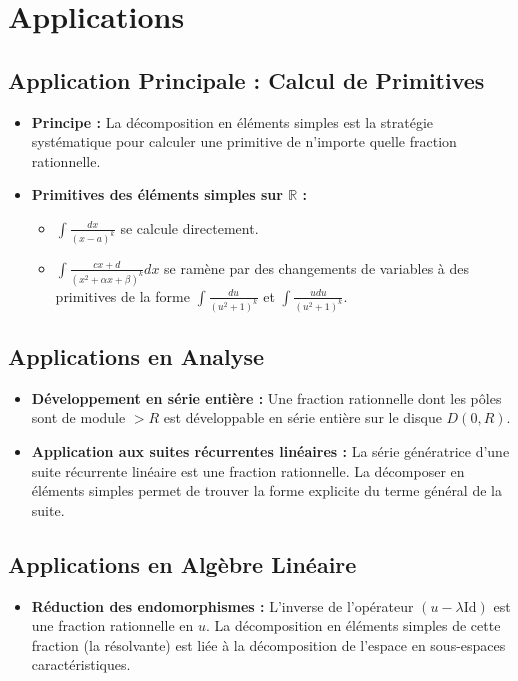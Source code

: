 \documentclass[12pt, a4paper, parskip=full]{report}
\theoremstyle{agregstyle}
\begin{document}
\section{Applications}

\subsection{Application Principale : Calcul de Primitives}
\begin{itemize}
    \item \textbf{Principe :} La décomposition en éléments simples est la stratégie systématique pour calculer une primitive de n'importe quelle fraction rationnelle.
    \item \textbf{Primitives des éléments simples sur $\mathbb{R}$ :}
        \begin{itemize}
            \item $\int \frac{dx}{(x-a)^k}$ se calcule directement.
            \item $\int \frac{cx+d}{(x^2+\alpha x+\beta)^k}dx$ se ramène par des changements de variables à des primitives de la forme $\int \frac{du}{(u^2+1)^k}$ et $\int \frac{u du}{(u^2+1)^k}$.
        \end{itemize}
\end{itemize}

\subsection{Applications en Analyse}
\begin{itemize}
    \item \textbf{Développement en série entière :} Une fraction rationnelle dont les pôles sont de module $> R$ est développable en série entière sur le disque $D(0,R)$.
    \item \textbf{Application aux suites récurrentes linéaires :} La série génératrice d'une suite récurrente linéaire est une fraction rationnelle. La décomposer en éléments simples permet de trouver la forme explicite du terme général de la suite.
\end{itemize}

\subsection{Applications en Algèbre Linéaire}
\begin{itemize}
    \item \textbf{Réduction des endomorphismes :} L'inverse de l'opérateur $(u-\lambda \mathrm{Id})$ est une fraction rationnelle en $u$. La décomposition en éléments simples de cette fraction (la résolvante) est liée à la décomposition de l'espace en sous-espaces caractéristiques.
\end{itemize}
\end{document}
